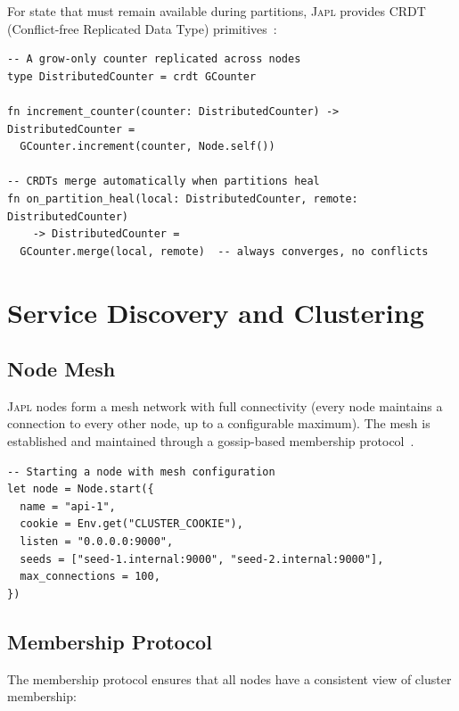 \documentclass[11pt,a4paper]{article}
\newcommand{\japl}{\textsc{Japl}}
\begin{document}
For state that must remain available during partitions, \japl{} provides
CRDT (Conflict-free Replicated Data Type) primitives~\citep{shapiro2011comprehensive}:

\begin{lstlisting}
-- A grow-only counter replicated across nodes
type DistributedCounter = crdt GCounter

fn increment_counter(counter: DistributedCounter) -> DistributedCounter =
  GCounter.increment(counter, Node.self())

-- CRDTs merge automatically when partitions heal
fn on_partition_heal(local: DistributedCounter, remote: DistributedCounter)
    -> DistributedCounter =
  GCounter.merge(local, remote)  -- always converges, no conflicts
\end{lstlisting}


\section{Service Discovery and Clustering}
\label{sec:discovery}

\subsection{Node Mesh}

\japl{} nodes form a mesh network with full connectivity (every node
maintains a connection to every other node, up to a configurable maximum).
The mesh is established and maintained through a gossip-based membership
protocol~\citep{vanrenesse1998gossip}.

\begin{lstlisting}
-- Starting a node with mesh configuration
let node = Node.start({
  name = "api-1",
  cookie = Env.get("CLUSTER_COOKIE"),
  listen = "0.0.0.0:9000",
  seeds = ["seed-1.internal:9000", "seed-2.internal:9000"],
  max_connections = 100,
})
\end{lstlisting}

\subsection{Membership Protocol}

The membership protocol ensures that all nodes have a consistent view of
cluster membership:
\end{document}
